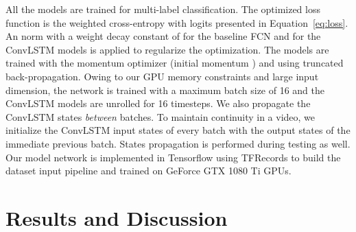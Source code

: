 \documentclass{svjour3}                     \smartqed
\begin{document}
All the models are trained for multi-label classification.
The optimized loss function  is the weighted cross-entropy with logits presented in Equation~\ref{eq:loss}.
An  norm with a weight decay constant of  for the baseline FCN and  for the ConvLSTM models is applied to regularize the optimization.
The models are trained with the momentum optimizer (initial momentum ) and using truncated back-propagation.
Owing to our GPU memory constraints and large input dimension, the network is trained with a maximum batch size of 16 and the ConvLSTM models are unrolled for 16 timesteps.
We also propagate the ConvLSTM states \emph{between} batches. To maintain continuity in a video, we initialize the ConvLSTM input states of every batch with the output states of the immediate previous batch.
States propagation is performed during testing as well.
Our model network is implemented in Tensorflow using TFRecords to build the dataset input pipeline and trained on GeForce GTX 1080 Ti GPUs.

\section{Results and Discussion}
\label{sec:results_discussion}
\end{document}
